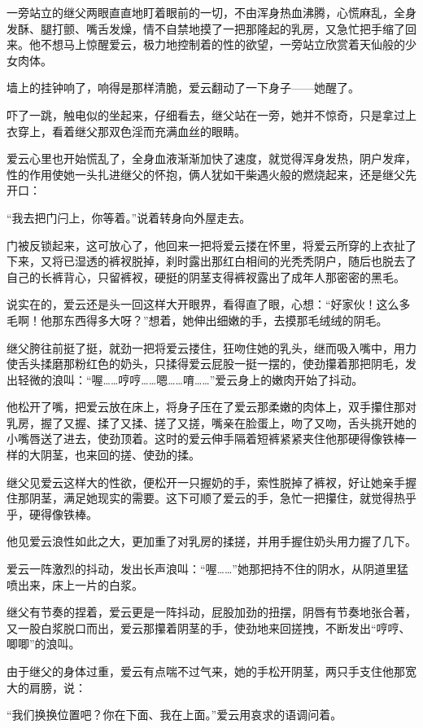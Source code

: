 \documentclass[12pt,UTF8]{ctexbook}
\begin{document}
一旁站立的继父两眼直直地盯着眼前的一切，不由浑身热血沸腾，心慌麻乱，全身发酥、腿打颤、嘴舌发燥，情不自禁地摸了一把那隆起的乳房，又急忙把手缩了回来。他不想马上惊醒爱云，极力地控制着的性的欲望，一旁站立欣赏着天仙般的少女肉体。

墙上的挂钟响了，响得是那样清脆，爱云翻动了一下身子——她醒了。

吓了一跳，触电似的坐起来，仔细看去，继父站在一旁，她并不惊奇，只是拿过上衣穿上，看着继父那双色淫而充满血丝的眼睛。

爱云心里也开始慌乱了，全身血液渐渐加快了速度，就觉得浑身发热，阴户发痒，性的作用使她一头扎进继父的怀抱，俩人犹如干柴遇火般的燃烧起来，还是继父先开口：

“我去把门闩上，你等着。”说着转身向外屋走去。

门被反锁起来，这可放心了，他回来一把将爱云搂在怀里，将爱云所穿的上衣扯了下来，又将已湿透的裤衩脱掉，刹时露出那红白相间的光秃秃阴户，随后也脱去了自己的长裤背心，只留裤衩，硬挺的阴茎支得裤衩露出了成年人那密密的黑毛。

说实在的，爱云还是头一回这样大开眼界，看得直了眼，心想：“好家伙！这么多毛啊！他那东西得多大呀？”想着，她伸出细嫩的手，去摸那毛绒绒的阴毛。

继父胯往前挺了挺，就劲一把将爱云搂住，狂吻住她的乳头，继而吸入嘴中，用力使舌头揉磨那粉红色的奶头，只揉得爱云屁股一挺一摆的，使劲攥着那把阴毛，发出轻微的浪叫：“喔……哼哼……嗯……唷……”爱云身上的嫩肉开始了抖动。

他松开了嘴，把爱云放在床上，将身子压在了爱云那柔嫩的肉体上，双手攥住那对乳房，握了又握、揉了又揉、搓了又搓，嘴亲在脸蛋上，吻了又吻，舌头挑开她的小嘴唇送了进去，使劲顶着。这时的爱云伸手隔着短裤紧紧夹住他那硬得像铁棒一样的大阴茎，也来回的搓、使劲的揉。

继父见爱云这样大的性欲，便松开一只握奶的手，索性脱掉了裤衩，好让她亲手握住那阴茎，满足她现实的需要。这下可顺了爱云的手，急忙一把攥住，就觉得热乎乎，硬得像铁棒。

他见爱云浪性如此之大，更加重了对乳房的揉搓，并用手握住奶头用力握了几下。

爱云一阵激烈的抖动，发出长声浪叫：“喔……”她那把持不住的阴水，从阴道里猛喷出来，床上一片的白浆。

继父有节奏的捏着，爱云更是一阵抖动，屁股加劲的扭摆，阴唇有节奏地张合著，又一股白浆脱口而出，爱云那攥着阴茎的手，使劲地来回搓拽，不断发出“哼哼、唧唧”的浪叫。

由于继父的身体过重，爱云有点喘不过气来，她的手松开阴茎，两只手支住他那宽大的肩膀，说：

“我们换换位置吧？你在下面、我在上面。”爱云用哀求的语调问着。
\end{document}
